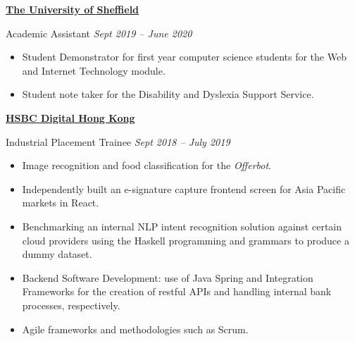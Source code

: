 \documentclass[10pt]{article} %
\begin{document}
\begin{changemargin}{0pt}{0.5pt}
\begin{minipage}[t]{0.5\textwidth}
\begin{changemargin}{5pt}{5pt}

\vspace{5pt}
\underline{\textbf{The University of Sheffield}}\\
\par
\vspace{-10pt}
Academic Assistant \hfill \textit{Sept 2019 -- June 2020}\\
\vspace{-10pt}

\begin{itemize} \itemsep-2pt %
  \item Student Demonstrator for first year computer science students for the Web and Internet Technology module.
  \item Student note taker for the Disability and Dyslexia Support Service.
\end{itemize}


\vspace{5pt}
\underline{\textbf{HSBC Digital Hong Kong}}\\
\par
\vspace{-10pt}
 Industrial Placement Trainee \textit{\hfill Sept 2018 -- July 2019} \\
\vspace{-10pt}

\begin{itemize} \itemsep-2pt %
  \item Image recognition and  food classification for the \textit{Offerbot}.
  \item Independently built an e-signature capture frontend screen for Asia Pacific markets in React.
  \item Benchmarking an internal NLP intent recognition solution against certain cloud providers using the Haskell programming and grammars to produce a dummy dataset.
  \item Backend Software Development: use of Java Spring and Integration Frameworks for the creation of restful APIs and handling internal bank processes, respectively.
  \item Agile frameworks and methodologies such as Scrum.
\end{itemize}


\end{changemargin}
\end{minipage}
\end{changemargin}
\end{document}

